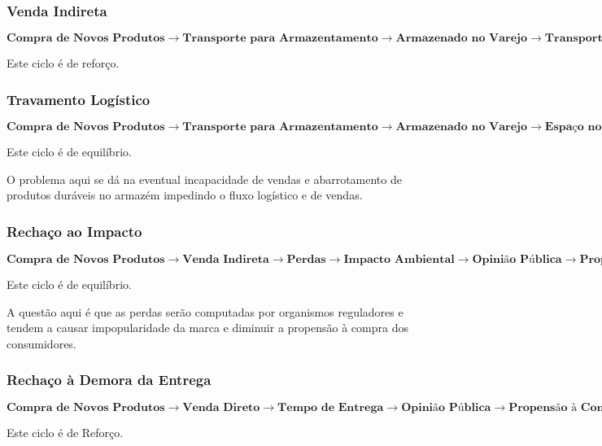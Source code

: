 \documentclass[]{article}
\begin{document}
	\subsubsection{Venda Indireta}
	
	\begin{center}
		$\textbf{Compra de Novos Produtos} \rightarrow \textbf{Transporte para Armazentamento} \rightarrow \textbf{Armazenado no Varejo} \rightarrow \textbf{Transporte para o Consumidor} \rightarrow \textbf{Venda} \rightarrow \textbf{Ganhos} \rightarrow \textbf{Compra} $
	\end{center}
	Este ciclo é de reforço.
	
	
	
	\subsubsection{Travamento Logístico}
	
	\begin{center}
		$\textbf{Compra de Novos Produtos} \rightarrow \textbf{Transporte para Armazentamento} \rightarrow \textbf{Armazenado no Varejo} \rightarrow \textbf{Espaço no Armazém} \rightarrow \textbf{Compra de Novos Produtos} $
	\end{center}
	Este ciclo é de equilíbrio.
	
	O problema aqui se dá na eventual incapacidade de vendas e abarrotamento de produtos duráveis no armazém impedindo o fluxo logístico e de vendas.
	
	\subsubsection{Rechaço ao Impacto}
	
	\begin{center}
		$\textbf{Compra de Novos Produtos} \rightarrow \textbf{Venda Indireta} \rightarrow \textbf{Perdas} \rightarrow \textbf{Impacto Ambiental} \rightarrow \textbf{Opinião Pública} \rightarrow \textbf{Propensão à Compra} \rightarrow \textbf{Venda} \rightarrow \textbf{Ganhos} \rightarrow \textbf{Compra de Novos Produtos} $
	\end{center}
	Este ciclo é de equilíbrio.
	
	A questão aqui é que as perdas serão computadas por organismos reguladores e tendem a causar impopularidade da marca e diminuir a propensão à compra dos consumidores.
	
	\subsubsection{Rechaço à Demora da Entrega}
	\begin{center}
		$\textbf{Compra de Novos Produtos} \rightarrow \textbf{Venda Direto} \rightarrow \textbf{Tempo de Entrega} \rightarrow \textbf{Opinião Pública} \rightarrow \textbf{Propensão à Compra} \rightarrow \textbf{Venda} \rightarrow \textbf{Ganhos} \rightarrow \textbf{Compra de Novos Produtos} $
	\end{center}
	Este ciclo é de Reforço.
	
\end{document}
